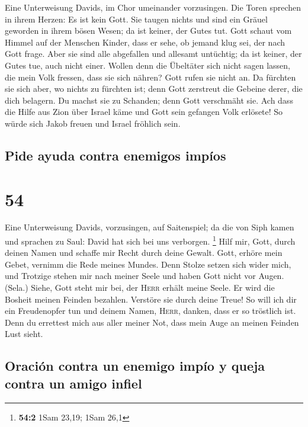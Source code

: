  Eine Unterweisung Davids, im Chor umeinander vorzusingen.
 Die Toren sprechen in ihrem Herzen: Es ist kein Gott. Sie
taugen nichts und sind ein Gräuel geworden in ihrem bösen Wesen; da ist
keiner, der Gutes tut.  Gott schaut vom Himmel auf der
Menschen Kinder, dass er sehe, ob jemand klug sei, der nach Gott frage.
 Aber sie sind alle abgefallen und allesamt untüchtig; da
ist keiner, der Gutes tue, auch nicht einer.  Wollen denn
die Übeltäter sich nicht sagen lassen, die mein Volk fressen, dass sie
sich nähren? Gott rufen sie nicht an.  Da fürchten sie
sich aber, wo nichts zu fürchten ist; denn Gott zerstreut die Gebeine
derer, die dich belagern. Du machst sie zu Schanden; denn Gott
verschmäht sie.  Ach dass die Hilfe aus Zion über Israel
käme und Gott sein gefangen Volk erlösete! So würde sich Jakob freuen
und Israel fröhlich sein.

\hypertarget{pide-ayuda-contra-enemigos-impuxedos}{%
\subsection{Pide ayuda contra enemigos
impíos}\label{pide-ayuda-contra-enemigos-impuxedos}}

\hypertarget{section-53}{%
\section{54}\label{section-53}}

 Eine Unterweisung Davids, vorzusingen, auf Saitenspiel;
 da die von Siph kamen und sprachen zu Saul: David hat
sich bei uns verborgen. \footnote{\textbf{54:2} 1Sam 23,19; 1Sam 26,1}
 Hilf mir, Gott, durch deinen Namen und schaffe mir Recht
durch deine Gewalt.  Gott, erhöre mein Gebet, vernimm die
Rede meines Mundes.  Denn Stolze setzen sich wider mich,
und Trotzige stehen mir nach meiner Seele und haben Gott nicht vor
Augen. (Sela.)  Siehe, Gott steht mir bei, der
\textsc{Herr} erhält meine Seele.  Er wird die Bosheit
meinen Feinden bezahlen. Verstöre sie durch deine Treue! 
So will ich dir ein Freudenopfer tun und deinem Namen, \textsc{Herr},
danken, dass er so tröstlich ist.  Denn du errettest mich
aus aller meiner Not, dass mein Auge an meinen Feinden Lust sieht.

\hypertarget{oraciuxf3n-contra-un-enemigo-impuxedo-y-queja-contra-un-amigo-infiel}{%
\subsection{Oración contra un enemigo impío y queja contra un amigo
infiel}\label{oraciuxf3n-contra-un-enemigo-impuxedo-y-queja-contra-un-amigo-infiel}}

